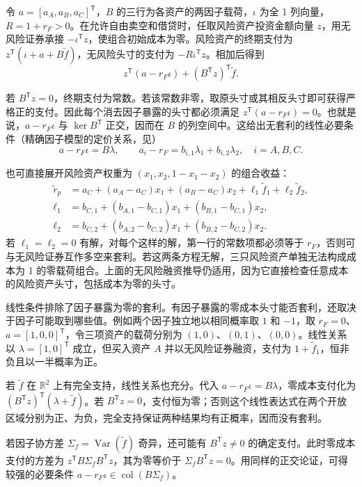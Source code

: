 \begin{solution}[blank-type=manual,blank-vsep=9\baselineskip]

令 $a=[a_A,a_B,a_C]^{\mathsf T}$，$B$ 的三行为各资产的两因子载荷，$\iota$ 为全 1 列向量，$R=1+r_F>0$。在允许自由卖空和借贷时，任取风险资产投资金额向量 $z$，用无风险证券承接 $-\iota^{\mathsf T}z$，使组合初始成本为零。风险资产的终期支付为 $z^{\mathsf T}(\iota+a+B\widetilde f)$，无风险头寸的支付为 $-R\iota^{\mathsf T}z$。相加后得到
\[
 z^{\mathsf T}(a-r_F\iota)+(B^{\mathsf T}z)^{\mathsf T}\widetilde f.
\]

若 $B^{\mathsf T}z=0$，终期支付为常数。若该常数非零，取原头寸或其相反头寸即可获得严格正的支付。因此每个消去因子暴露的头寸都必须满足 $z^{\mathsf T}(a-r_F\iota)=0$。也就是说，$a-r_F\iota$ 与 $\ker B^{\mathsf T}$ 正交，因而在 $B$ 的列空间中。这给出无套利的线性必要条件\ifdefined\WJHandoutKnowledge（精确因子模型的定价关系，见）\fi
\[
 \boxed{a-r_F\iota=B\lambda},\qquad
 a_i-r_F=b_{i,1}\lambda_1+b_{i,2}\lambda_2,\quad i=A,B,C.
\]

也可直接展开风险资产权重为 $(x_1,x_2,1-x_1-x_2)$ 的组合收益：
\begin{align*}
 \widetilde r_p
 &=a_C+(a_A-a_C)x_1+(a_B-a_C)x_2
   +\ell_1\widetilde f_1+\ell_2\widetilde f_2,\\
 \ell_1&=b_{C,1}+(b_{A,1}-b_{C,1})x_1+(b_{B,1}-b_{C,1})x_2,\\
 \ell_2&=b_{C,2}+(b_{A,2}-b_{C,2})x_1+(b_{B,2}-b_{C,2})x_2.
\end{align*}
若 $\ell_1=\ell_2=0$ 有解，对每个这样的解，第一行的常数项都必须等于 $r_F$，否则可与无风险证券互作多空来套利。若这两条方程无解，三只风险资产单独无法构成成本为 1 的零载荷组合。上面的无风险融资推导仍适用，因为它直接检查任意成本的风险资产头寸，包括成本为零的头寸。

线性条件排除了因子暴露为零的套利。有因子暴露的零成本头寸能否套利，还取决于因子可能取到哪些值。例如两个因子独立地以相同概率取 $1$ 和 $-1$，取 $r_F=0$、$a=[1,0,0]^{\mathsf T}$，令三项资产的载荷分别为 $(1,0)$、$(0,1)$、$(0,0)$。线性关系以 $\lambda=[1,0]^{\mathsf T}$ 成立，但买入资产 $A$ 并以无风险证券融资，支付为 $1+\widetilde f_1$，恒非负且以一半概率为正。

若 $\widetilde f$ 在 $\mathbb R^2$ 上有完全支持，线性关系也充分。代入 $a-r_F\iota=B\lambda$，零成本支付化为 $(B^{\mathsf T}z)^{\mathsf T}(\lambda+\widetilde f)$。若 $B^{\mathsf T}z=0$，支付恒为零；否则这个线性表达式在两个开放区域分别为正、为负，完全支持保证两种结果均有正概率，因而没有套利。

若因子协方差 $\Sigma_f=\operatorname{Var}(\widetilde f)$ 奇异，还可能有 $B^{\mathsf T}z\ne0$ 的确定支付。此时零成本支付的方差为 $z^{\mathsf T}B\Sigma_f B^{\mathsf T}z$，其为零等价于 $\Sigma_f B^{\mathsf T}z=0$。用同样的正交论证，可得较强的必要条件 $a-r_F\iota\in\operatorname{col}(B\Sigma_f)$。


\end{solution}
